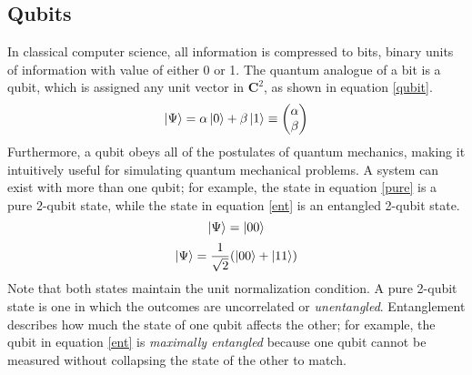 \documentclass{article}
\begin{document}
\subsection{Qubits}
\begin{paragraph}{}
In classical computer science, all information is compressed to bits, binary units of information with value of either 0 or 1. \cite{nielsen}  The quantum analogue of a bit is a qubit, which is assigned any unit vector in $\mathbf{C}^2$, as shown in equation \ref{qubit}. \cite{nielsen}
\begin{equation}\label{qubit}
\ket{\Psi} = \alpha\ket{0}+\beta\ket{1}\equiv \begin{pmatrix}\alpha\\ \beta \end{pmatrix}
\end{equation}
Furthermore, a qubit obeys all of the postulates of quantum mechanics, making it intuitively useful for simulating quantum mechanical problems. \cite{nielsen}\cite{feynman} A system can exist with more than one qubit; for example, the state in equation \ref{pure} is a pure 2-qubit state, while the state in equation \ref{ent} is an entangled 2-qubit state.
\begin{equation}\label{pure}
\ket{\Psi}=\ket{00}
\end{equation}
\begin{equation}\label{ent}
\ket{\Psi}=\frac{1}{\sqrt{2}}(\ket{00}+\ket{11})
\end{equation}
Note that both states maintain the unit normalization condition.  A pure 2-qubit state is one in which the outcomes are uncorrelated or \textit{unentangled}.  Entanglement describes how much the state of one qubit affects the other; for example, the qubit in equation \ref{ent} is \textit{maximally entangled} because one qubit cannot be measured without collapsing the state of the other to match.
\end{paragraph}
\end{document}
